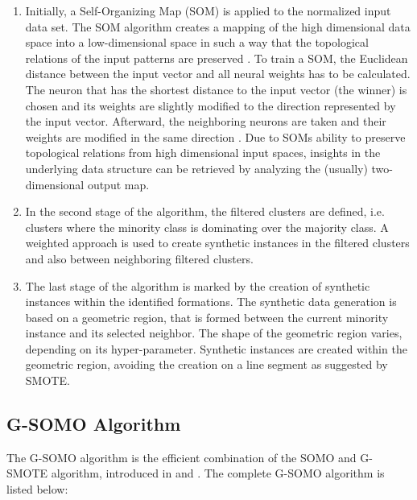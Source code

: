 \documentclass[parskip=full]{scrartcl}
\begin{document}
\begin{enumerate}

	\item Initially, a Self-Organizing Map (SOM) is applied to the normalized
		  input data set. The SOM algorithm creates a mapping of the high
		  dimensional data space into a low-dimensional space in such a way that
		  the topological relations of the input patterns are preserved
		  \cite{KOKUER2007}. To train a SOM, the Euclidean distance between the
		  input vector and all neural weights has to be calculated. The neuron
		  that has the shortest distance to the input vector (the winner) is
		  chosen and its weights are slightly modified to the direction
		  represented by the input vector. Afterward, the neighboring neurons
		  are taken and their weights are modified in the same direction
		  \cite{Brocki2007}. Due to SOMs ability to preserve topological
		  relations from high dimensional input spaces, insights in the
		  underlying data structure can be retrieved by analyzing the (usually)
		  two-dimensional output map. 
	
	\item In the second stage of the algorithm, the filtered clusters are
		  defined, i.e. clusters where the minority class is dominating over the
		  majority class. A weighted approach is used to create synthetic
		  instances in the filtered clusters and also between neighboring
		  filtered clusters. 
		  
	\item The last stage of the algorithm is marked by the creation of synthetic
		  instances within the identified formations. The synthetic data
		  generation is based on a geometric region, that is formed between the
		  current minority instance and its selected neighbor. The shape of the
		  geometric region varies, depending on its hyper-parameter. Synthetic
		  instances are created within the geometric region, avoiding the
		  creation on a line segment as suggested by SMOTE.

\end{enumerate}

\subsection{G-SOMO Algorithm}

The G-SOMO algorithm is the efficient combination of the SOMO and G-SMOTE
algorithm, introduced in \cite{Douzas2017B} and \cite{Douzas2017}. The complete
G-SOMO algorithm is listed below:
\end{document}
